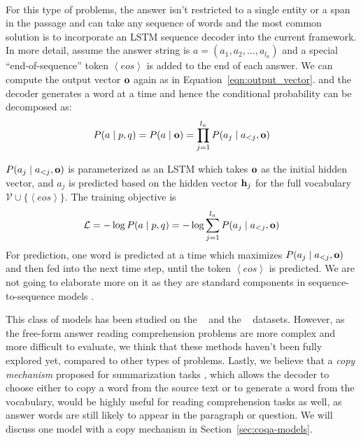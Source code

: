 \paragraph{} For this type of problems, the answer isn't restricted to a single entity or a span in the passage and can take any sequence of words and the most common solution is to incorporate an LSTM sequence decoder into the current framework. In more detail, assume the answer string is $a = (a_1, a_2, \ldots, a_{l_a})$ and a special ``end-of-sequence'' token $\left<eos\right>$ is added to the end of each answer. We can compute the output vector $\mathbf{o}$ again as in Equation~\ref{eqn:output_vector}. and the decoder generates a word at a time and hence the conditional probability can be decomposed as:
\begin{equation}
    P(a \mid p, q) =  P(a \mid \mathbf{o}) = \prod_{j = 1}^{l_a}P(a_j \mid a_{<j}, \mathbf{o})
\end{equation}

$P(a_j \mid a_{<j}, \mathbf{o})$ is parameterized as an LSTM which takes $\mathbf{o}$ as the initial hidden vector, and $a_j$ is predicted based on the hidden vector $\mathbf{h}_j$ for the full vocabulary $\mathcal{V} \cup \{\left<eos\right>\}$. The training objective is
\begin{equation}
\mathcal{L} = -\log{P(a \mid p, q)} = -\log\sum_{j = 1}^{l_a}P(a_j \mid a_{<j}, \mathbf{o})
\end{equation}
For prediction, one word is predicted at a time which maximizes $P(a_j \mid a_{<j}, \mathbf{o})$ and then fed into the next time step, until the token $\left<eos\right>$ is predicted. We are not going to elaborate more on it as they are standard components in sequence-to-sequence models \cite{sutskever2014sequence}.

This class of models has been studied on the ~\cite{nguyen2016ms} and the ~\cite{kovcisky2018narrativeqa} datasets. However, as the free-form answer reading comprehension problems are more complex and more difficult to evaluate, we think that these methods haven't been fully explored yet, compared to other types of problems. Lastly, we believe that a \textit{copy mechanism} proposed for summarization tasks  \cite{gu2016incorporating,see2017get}, which allows the decoder to choose either to copy a word from the source text or to generate a word from the vocabulary, would be highly useful for reading comprehension tasks as well, as answer words are still likely to appear in the paragraph or question. We will discuss one model with a copy mechanism in Section~\ref{sec:coqa-models}.
